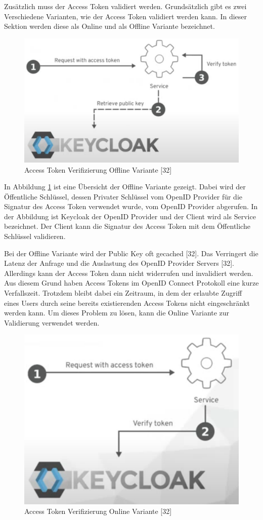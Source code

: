 Zusätzlich muss der Access Token validiert werden. Grundsätzlich gibt es zwei Verschiedene Varianten, wie der Access Token validiert werden kann. In dieser Sektion werden diese als Online und als Offline Variante bezeichnet.

\begin{figure}[!ht]
	\centering
	\includegraphics[width=.8\textwidth]{Images/Ebert/VerifyAccessTokenOffline.PNG}
	\caption{Access Token Verifizierung Offline Variante [32]}
	\label{fig:EB_Access Token Verifizierung Offline Variante}
\end{figure}

In Abbildung \ref{fig:EB_Access Token Verifizierung Offline Variante} ist eine Übersicht der Offline Variante gezeigt. Dabei wird der Öffentliche Schlüssel, dessen Privater Schlüssel vom OpenID Provider für die Signatur des Access Token verwendet wurde, vom OpenID Provider abgerufen. In der Abbildung ist Keycloak der OpenID Provider und der Client wird als Service bezeichnet. Der Client kann die Signatur des Access Token mit dem Öffentliche Schlüssel validieren.

Bei der Offline Variante wird der Public Key oft gecached [32]. Das Verringert die Latenz der Anfrage und die Auslastung des OpenID Provider Servers [32]. Allerdings kann der Access Token dann nicht widerrufen und invalidiert werden. Aus diesem Grund haben Access Tokens im OpenID Connect Protokoll eine kurze Verfallszeit. Trotzdem bleibt dabei ein Zeitraum, in dem der erlaubte Zugriff eines Users durch seine bereits existierenden Access Tokens nicht eingeschränkt werden kann. Um dieses Problem zu lösen, kann die Online Variante zur Validierung verwendet werden. %

\begin{figure}[!ht]
	\centering
	\includegraphics[width=.6\textwidth]{Images/Ebert/VerifyAccessTokenOnline.PNG}
	\caption{Access Token Verifizierung Online Variante [32]}
	\label{fig:EB_Access Token Verifizierung Online Variante}
\end{figure}

